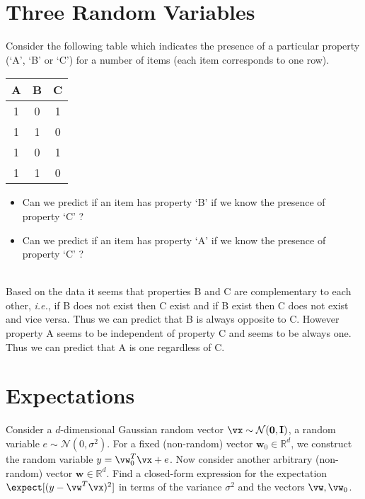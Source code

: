\documentclass[article,11pt]{article}
\begin{document}
\newpage
\section{Three Random Variables}
Consider the following table which indicates the presence of a particular property 
(`A', `B' or `C') for a number of items (each item corresponds to one row). 

\begin{tabular}{c|c|c}
\hline\hline
A & B & C \\ [0.5ex] %
\hline
1 & 0 & 1\\
1 & 1 & 0 \\
1 & 0 & 1 \\
1 & 1 & 0 \\
\hline
\end{tabular}

\begin{itemize}
\item Can we predict if an item has property `B' if we know the presence of property `C' ?
\item Can we predict if an item has property `A' if we know the presence of property `C' ?
\end{itemize} 
\\
Based on the data it seems that properties B and C are complementary to each
other, \textit{i.e.}, if B does not exist then C exist and if B exist then C
does not exist and vice versa. Thus we can predict that B is always opposite
to C. However property A seems to be independent of property C and seems to be
always one. Thus we can predict that A is one regardless of C.

\newpage
\section{Expectations}
Consider a $d$-dimensional Gaussian random vector $\vx \sim \mathcal{N}(\mathbf{0},\mathbf{I})$, 
a random variable $e \sim \mathcal{N}(0,\sigma^{2})$. 
For a fixed (non-random) vector $\mathbf{w}_{0} \in \mathbb{R}^{d}$, we construct the random variable $y= \vw_{0}^{T} \vx + e$. 
Now consider another arbitrary (non-random) vector $\mathbf{w} \in \mathbb{R}^{d}$. 
Find a closed-form expression for the expectation $\expect [ ( y - \vw^{T} \vx )^{2} ]$ in terms of the variance $\sigma^{2}$ and the vectors $\vw, \vw_{0}$. 
\end{document}
